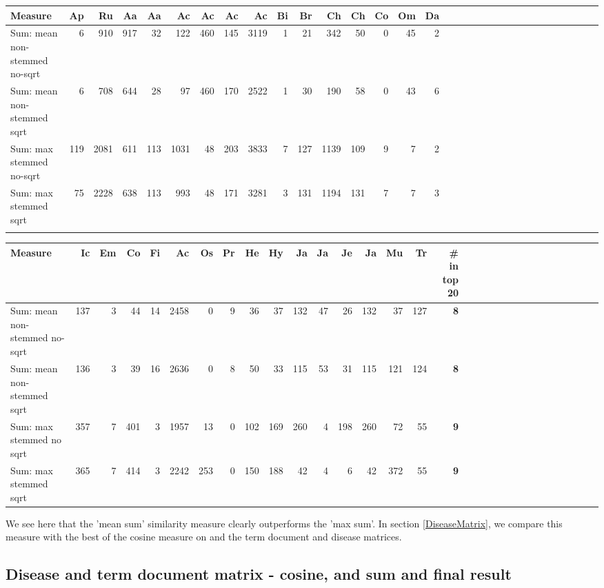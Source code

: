 \begin{table}[H]
\begin{tiny}
  \begin{tabular}{|l|r|r|r|r|r|r|r|r|r|r|r|r|r|r|r|r|r|r|r|r|r|r|r|r|r|r|r|r|r|r|r|}
    \hline
    Measure &Ap&Ru&Aa&Aa&Ac&Ac&Ac&Ac&Bi&Br&Ch&Ch&Co&Om&Da\\
    \hline
    Sum: mean non-stemmed no-sqrt &6&910&917&32&122&460&145&3119&1&21&342&50&0&45&2\\
    \hline
    Sum: mean non-stemmed sqrt &6&708&644&28&97&460&170&2522&1&30&190&58&0&43&6\\
    \hline
    Sum: max stemmed no-sqrt &119&2081&611&113&1031&48&203&3833&7&127&1139&109&9&7&2\\
    \hline
    Sum: max stemmed sqrt &75&2228&638&113&993&48&171&3281&3&131&1194&131&7&7&3 \\
    \hline
    \multicolumn{16}{c}{} \\
    \end{tabular}
    \begin{tabular}{|l|r|r|r|r|r|r|r|r|r|r|r|r|r|r|r|r|r|r|r|r|r|r|r|r|r|r|r|r|r|r|}
    \hline
     Measure &Ic&Em&Co&Fi&Ac&Os&Pr&He&Hy&Ja&Ja&Je&Ja&Mu&Tr &\scriptsize{\textbf{\# in top 20}} \\
    \hline
    Sum: mean non-stemmed no-sqrt &137&3&44&14&2458&0&9&36&37&132&47&26&132&37&127 & \scriptsize{\textbf{8}} \\
    \hline
    Sum: mean non-stemmed sqrt &136&3&39&16&2636&0&8&50&33&115&53&31&115&121&124 & \scriptsize{\textbf{8}} \\
    \hline
    Sum: max stemmed no sqrt &357&7&401&3&1957&13&0&102&169&260&4&198&260&72&55 & \scriptsize{\textbf{9}} \\
    \hline
    Sum: max stemmed sqrt &365&7&414&3&2242&253&0&150&188&42&4&6&42&372&55 & \scriptsize{\textbf{9}} \\
    \hline
  \end{tabular}
\end{tiny}
\end{table}

We see here that the 'mean sum' similarity measure clearly outperforms the 'max sum'. In section \ref{DiseaseMatrix}, we compare this measure with the best of the cosine measure on and the term document and disease matrices.

\subsection{Disease and term document matrix - cosine, and sum and final result}

